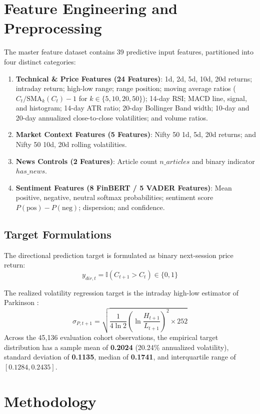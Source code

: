 \documentclass[10pt,journal,compsoc,twocolumn]{IEEEtran}
\begin{document}
\section{Feature Engineering and Preprocessing}
The master feature dataset contains 39 predictive input features, partitioned into four distinct categories:
\begin{enumerate}
    \item \textbf{Technical \& Price Features (24 Features)}: 1d, 2d, 5d, 10d, 20d returns; intraday return; high-low range; range position; moving average ratios ($C_t/\text{SMA}_k(C_t)-1$ for $k \in \{5, 10, 20, 50\}$); 14-day RSI; MACD line, signal, and histogram; 14-day ATR ratio; 20-day Bollinger Band width; 10-day and 20-day annualized close-to-close volatilities; and volume ratios.
    \item \textbf{Market Context Features (5 Features)}: Nifty 50 1d, 5d, 20d returns; and Nifty 50 10d, 20d rolling volatilities.
    \item \textbf{News Controls (2 Features)}: Article count $n\_articles$ and binary indicator $has\_news$.
    \item \textbf{Sentiment Features (8 FinBERT / 5 VADER Features)}: Mean positive, negative, neutral softmax probabilities; sentiment score $P(\text{pos}) - P(\text{neg})$; dispersion; and confidence.
\end{enumerate}

\subsection{Target Formulations}
The directional prediction target is formulated as binary next-session price return:
\begin{equation}
y_{dir, t} = \mathbb{I}(C_{t+1} > C_t) \in \{0, 1\}
\end{equation}

The realized volatility regression target is the intraday high-low estimator of Parkinson \cite{parkinson1980extreme}:
\begin{equation}
\sigma_{P, t+1} = \sqrt{ \frac{1}{4 \ln 2} \left( \ln \frac{H_{t+1}}{L_{t+1}} \right)^2 \times 252 }
\end{equation}
Across the 45,136 evaluation cohort observations, the empirical target distribution has a sample mean of \textbf{0.2024} (20.24\% annualized volatility), standard deviation of \textbf{0.1135}, median of \textbf{0.1741}, and interquartile range of $[0.1284, 0.2435]$.

\section{Methodology}
\end{document}

